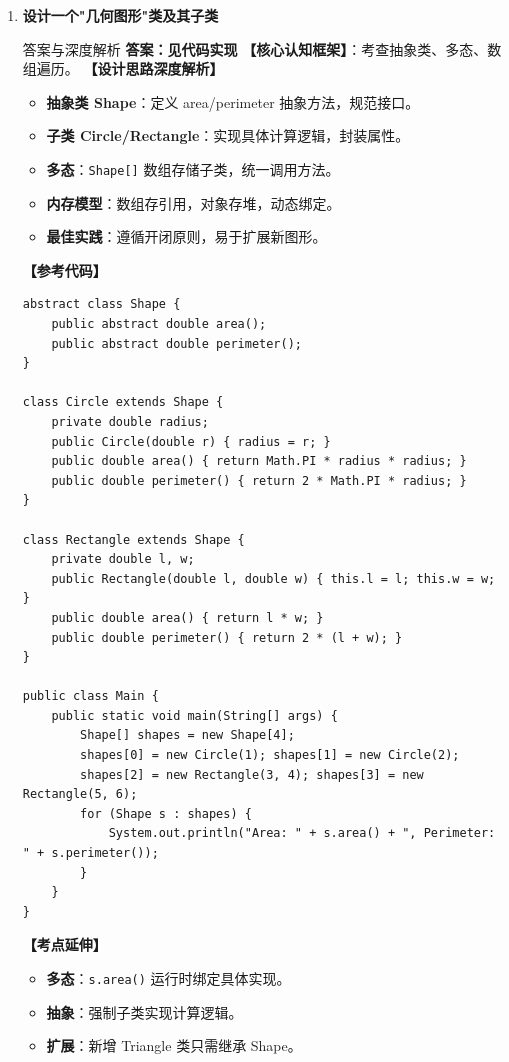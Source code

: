 \documentclass[12pt, a4paper]{ctexart}
\newcommand{\code}[1]{\texttt{\color{myblue}#1}}
\begin{document}
\begin{enumerate}[label=\arabic*.]
\item \textbf{设计一个"几何图形"类及其子类}
\begin{bluebox}{答案与深度解析}
\textbf{答案：见代码实现}
\textbf{【核心认知框架】}：考查抽象类、多态、数组遍历。
\textbf{【设计思路深度解析】}
\begin{itemize}[leftmargin=*, nosep]
    \item \textbf{抽象类 Shape}：定义 area/perimeter 抽象方法，规范接口。
    \item \textbf{子类 Circle/Rectangle}：实现具体计算逻辑，封装属性。
    \item \textbf{多态}：\code{Shape[]} 数组存储子类，统一调用方法。
    \item \textbf{内存模型}：数组存引用，对象存堆，动态绑定。
    \item \textbf{最佳实践}：遵循开闭原则，易于扩展新图形。
\end{itemize}
\textbf{【参考代码】}
\begin{lstlisting}
abstract class Shape {
    public abstract double area();
    public abstract double perimeter();
}

class Circle extends Shape {
    private double radius;
    public Circle(double r) { radius = r; }
    public double area() { return Math.PI * radius * radius; }
    public double perimeter() { return 2 * Math.PI * radius; }
}

class Rectangle extends Shape {
    private double l, w;
    public Rectangle(double l, double w) { this.l = l; this.w = w; }
    public double area() { return l * w; }
    public double perimeter() { return 2 * (l + w); }
}

public class Main {
    public static void main(String[] args) {
        Shape[] shapes = new Shape[4];
        shapes[0] = new Circle(1); shapes[1] = new Circle(2);
        shapes[2] = new Rectangle(3, 4); shapes[3] = new Rectangle(5, 6);
        for (Shape s : shapes) {
            System.out.println("Area: " + s.area() + ", Perimeter: " + s.perimeter());
        }
    }
}
\end{lstlisting}
\textbf{【考点延伸】}
\begin{itemize}[leftmargin=*, nosep]
    \item \textbf{多态}：\code{s.area()} 运行时绑定具体实现。
    \item \textbf{抽象}：强制子类实现计算逻辑。
    \item \textbf{扩展}：新增 Triangle 类只需继承 Shape。
\end{itemize}
\end{bluebox}


\end{enumerate}
\end{document}
